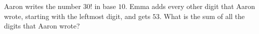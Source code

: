 Aaron writes the number $30!$ in base $10$. Emma adds every other digit that Aaron wrote, starting with the leftmost digit, and gets $53$. What is the sum of all the digits that Aaron wrote?
